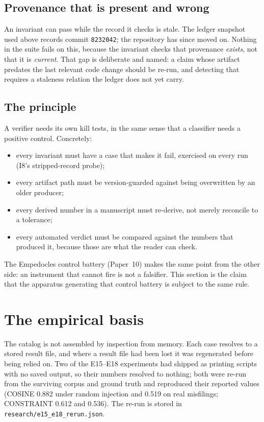 \documentclass[11pt]{article}
\begin{document}
\subsection{Provenance that is present and wrong}

An invariant can pass while the record it checks is stale. The ledger
snapshot used above records commit \texttt{8232042}; the repository has
since moved on. Nothing in the suite fails on this, because the invariant
checks that provenance \emph{exists}, not that it is \emph{current}. That
gap is deliberate and named: a claim whose artifact predates the last
relevant code change should be re-run, and detecting that requires a
staleness relation the ledger does not yet carry.

\subsection{The principle}

A verifier needs its own kill tests, in the same sense that a classifier
needs a positive control. Concretely:

\begin{itemize}
\item every invariant must have a case that makes it fail, exercised on
  every run (I8's stripped-record probe);
\item every artifact path must be version-guarded against being overwritten
  by an older producer;
\item every derived number in a manuscript must re-derive, not merely
  reconcile to a tolerance;
\item every automated verdict must be compared against the numbers that
  produced it, because those are what the reader can check.
\end{itemize}

The Empedocles control battery (Paper~10) makes the same point from the other
side: an instrument that cannot fire is not a falsifier. This section is the
claim that the apparatus generating that control battery is subject to the
same rule.

\section{The empirical basis}

The catalog is not assembled by inspection from memory. Each case resolves
to a stored result file, and where a result file had been lost it was
regenerated before being relied on. Two of the E15--E18 experiments had
shipped as printing scripts with no saved output, so their numbers resolved
to nothing; both were re-run from the surviving corpus and ground truth and
reproduced their reported values (COSINE 0.882 under random injection and
0.519 on real misfilings; CONSTRAINT 0.612 and 0.536). The re-run is stored
in \texttt{research/e15\_e18\_rerun.json}.
\end{document}
